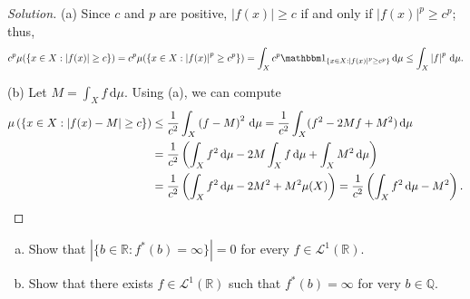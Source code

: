 \documentclass[10pt]{article}
\newcommand{\dd}{\,\mathrm{d}}
\providecommand{\QQ}{\mathbb Q}
\providecommand{\RR}{\mathbb R}
\providecommand{\ind}{\mathbbm 1}
\providecommand{\ii}{\item}
\newenvironment{soln}{\begin{proof}[Solution]}{\end{proof}}
\providecommand{\abs}[1]{\left\lvert #1\right\rvert}
\begin{document}
\begin{soln}
    (a) Since $c$ and $p$ are positive, $\abs{f(x)}\ge c$ if and only if
    $\abs{f(x)}^p\ge c^p$; thus,
    \begin{equation*}
	c^p\mu(\{x\in X : \abs{f(x)}\ge c\})
	= c^p\mu(\{x\in X : \abs{f(x)}^p\ge c^p\}) =
	\int_Xc^p\ind_{\{x\in X : \abs{f(x)}^p\ge c^p\}}\dd\mu
	\le \int_X\abs{f}^p\dd\mu.
    \end{equation*}

    (b) Let $M = \int_Xf\dd\mu$. Using (a), we can compute
    \begin{align*}
        \mu\left(\left\{x\in X: \abs{f(x) - M} \ge c\right\}\right)
	&\le \frac 1{c^2}\int_X\left(f - M\right)^2\dd\mu
	= \frac 1{c^2}\int_X(f^2 - 2Mf + M^2)\dd\mu\\
	&= \frac1{c^2}\left(\int_Xf^2\dd\mu - 2M\int_Xf\dd\mu + \int_XM^2\dd\mu\right)\\
	&= \frac1{c^2}\left(\int_Xf^2\dd\mu - 2M^2 + M^2\mu(X)\right)
	= \frac1{c^2}\left(\int_Xf^2\dd\mu - M^2\right)\qedhere.
    \end{align*}
\end{soln}
\pagebreak

\begin{problem}
    [Axler 4A \#12,13]
    \begin{enumerate}[(a)]
	\ii Show that $\abs{\{b\in\RR : f^*(b) = \infty\}} = 0$
	for every $f\in\mathcal L^1(\RR)$.
	\ii Show that there exists $f\in\mathcal L^1(\RR)$ such that
	$f^*(b) = \infty$ for very $b\in\QQ$.
    \end{enumerate}
\end{problem}
\end{document}
